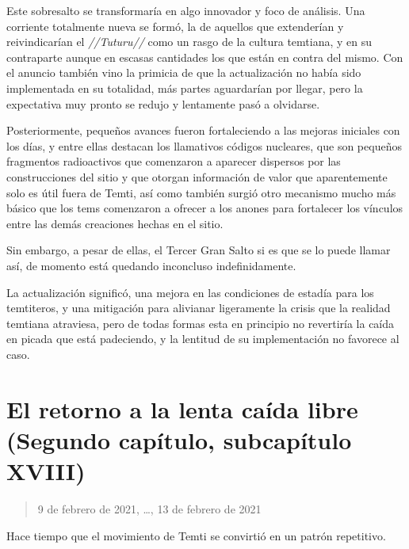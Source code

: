 \documentclass[
  spanish,
]{book}
\begin{document}
Este sobresalto se transformaría en algo innovador y foco de análisis.
Una corriente totalmente nueva se formó, la de aquellos que extenderían y reivindicarían el \emph{//Tuturu//} como un rasgo de la cultura temtiana, y en su contraparte aunque en escasas cantidades los que están en contra del mismo. Con el anuncio también vino la primicia de que la actualización no había sido implementada en su totalidad, más partes aguardarían por llegar, pero la expectativa muy pronto se redujo y lentamente pasó a olvidarse.

Posteriormente, pequeños avances fueron fortaleciendo a las mejoras iniciales con los días, y entre ellas destacan los llamativos códigos nucleares, que son pequeños fragmentos radioactivos que comenzaron a aparecer dispersos por las construcciones del sitio y que otorgan información de valor que aparentemente solo es útil fuera de Temti, así como también surgió otro mecanismo mucho más básico que los tems comenzaron a ofrecer a los anones para fortalecer los vínculos entre las demás creaciones hechas en el sitio.

Sin embargo, a pesar de ellas, el Tercer Gran Salto si es que se lo puede llamar así, de momento está quedando inconcluso indefinidamente.

La actualización significó, una mejora en las condiciones de estadía para los temtiteros, y una mitigación para alivianar ligeramente la crisis que la realidad temtiana atraviesa, pero de todas formas esta en principio no revertiría la caída en picada que está padeciendo, y la lentitud de su implementación no favorece al caso.

\hypertarget{el-retorno-a-la-lenta-cauxedda-libre-segundo-capuxedtulo-subcapuxedtulo-xviii}{%
\section{El retorno a la lenta caída libre (Segundo capítulo, subcapítulo XVIII)}\label{el-retorno-a-la-lenta-cauxedda-libre-segundo-capuxedtulo-subcapuxedtulo-xviii}}

\begin{quote}
9 de febrero de 2021, \ldots, 13 de febrero de 2021
\end{quote}

Hace tiempo que el movimiento de Temti se convirtió en un patrón repetitivo.
\end{document}
